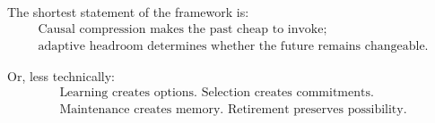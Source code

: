 \documentclass[11pt]{article}
\begin{document}
The shortest statement of the framework is:
\[
\boxed{\begin{gathered}
\text{Causal compression makes the past cheap to invoke;}\\
\text{adaptive headroom determines whether the future remains changeable.}
\end{gathered}}
\]

Or, less technically:
\[
\boxed{\begin{gathered}
\text{Learning creates options. Selection creates commitments.}\\
\text{Maintenance creates memory. Retirement preserves possibility.}
\end{gathered}}
\]



\end{document}
